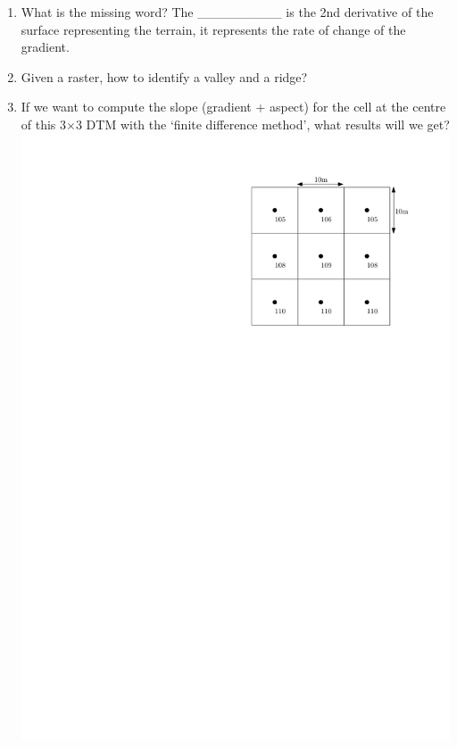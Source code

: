 \begin{enumerate}
  \item What is the missing word? The \_\_\_\_\_\_\_\_\_ is the 2nd derivative of the surface representing the terrain, it represents the rate of change of the gradient.
  \item Given a raster, how to identify a valley and a ridge?
  \item If we want to compute the slope (gradient + aspect) for the cell at the centre of this 3$\times$3 DTM with the `finite difference method', what results will we get?
  \\
  \includegraphics[width=0.4\linewidth]{figs/slope_grid_question}
\end{enumerate}
